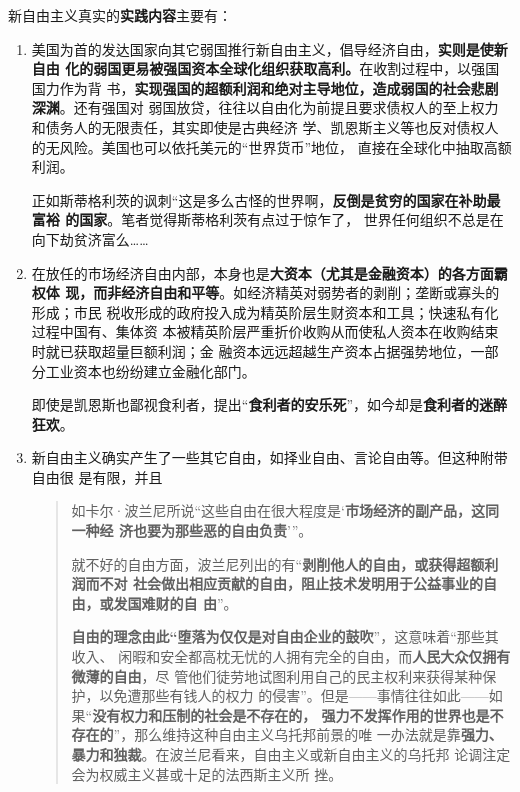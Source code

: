 新自由主义真实的\textbf{实践内容}主要有：
\begin{enumerate}
\item 美国为首的发达国家向其它弱国推行新自由主义，倡导经济自由，\textbf{实则是使新自由
    化的弱国更易被强国资本全球化组织获取高利。}在收割过程中，以强国国力作为背
  书，\textbf{实现强国的超额利润和绝对主导地位，造成弱国的社会悲剧深渊}。还有强国对
  弱国放贷，往往以自由化为前提且要求债权人的至上权力和债务人的无限责任，其实即使是古典经济
  学、凯恩斯主义等也反对债权人的无风险。美国也可以依托美元的“世界货币”地位，
  直接在全球化中抽取高额利润。

  正如斯蒂格利茨的讽刺“这是多么古怪的世界啊，\textbf{反倒是贫穷的国家在补助最富裕
    的国家}\cite[75]{davidneoliber}。笔者觉得斯蒂格利茨有点过于惊乍了，
  世界任何组织不总是在向下劫贫济富么……


\item 在放任的市场经济自由内部，本身也是\textbf{大资本（尤其是金融资本）的各方面霸权体
    现，而非经济自由和平等}。如经济精英对弱势者的剥削；垄断或寡头的形成；市民
  税收形成的政府投入成为精英阶层生财资本和工具；快速私有化过程中国有、集体资
  本被精英阶层严重折价收购从而使私人资本在收购结束时就已获取超量巨额利润；金
  融资本远远超越生产资本占据强势地位，一部分工业资本也纷纷建立金融化部门。

  即使是凯恩斯也鄙视食利者，提出“\textbf{食利者的安乐死}”，如今却是\textbf{食利者的迷醉
    狂欢}。

\item 新自由主义确实产生了一些其它自由，如择业自由、言论自由等。但这种附带自由很
  是有限，并且
  \begin{quotation}
    如卡尔·波兰尼所说“这些自由在很大程度是‘\textbf{市场经济的副产品，这同一种经
      济也要为那些恶的自由负责}’”。

    就不好的自由方面，波兰尼列出的有“\textbf{剥削他人的自由，或获得超额利润而不对
      社会做出相应贡献的自由，阻止技术发明用于公益事业的自由，或发国难财的自
      由}”。

    \textbf{自由的理念由此“堕落为仅仅是对自由企业的鼓吹}”，这意味着“那些其收入、
    闲暇和安全都高枕无忧的人拥有完全的自由，而\textbf{人民大众仅拥有微薄的自由}，尽
    管他们徒劳地试图利用自己的民主权利来获得某种保护，以免遭那些有钱人的权力
    的侵害”。但是——事情往往如此——如果“\textbf{没有权力和压制的社会是不存在的，
      强力不发挥作用的世界也是不存在的}”，那么维持这种自由主义乌托邦前景的唯
    一办法就是靠\textbf{强力、暴力和独裁}。在波兰尼看来，自由主义或新自由主义的乌托邦
    论调注定会为权威主义甚或十足的法西斯主义所
    挫。 \cite[38-39]{davidneoliber}
  \end{quotation}


\end{enumerate}
